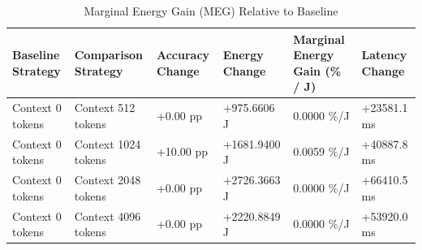 \begin{table}
\caption{Marginal Energy Gain (MEG) Relative to Baseline}
\label{tab:marginal_energy_gain}
\begin{tabular}{llllll}
\toprule
Baseline Strategy & Comparison Strategy & Accuracy Change & Energy Change & Marginal Energy Gain (\% / J) & Latency Change \\
\midrule
Context 0 tokens & Context 512 tokens & +0.00 pp & +975.6606 J & 0.0000 \%/J & +23581.1 ms \\
Context 0 tokens & Context 1024 tokens & +10.00 pp & +1681.9400 J & 0.0059 \%/J & +40887.8 ms \\
Context 0 tokens & Context 2048 tokens & +0.00 pp & +2726.3663 J & 0.0000 \%/J & +66410.5 ms \\
Context 0 tokens & Context 4096 tokens & +0.00 pp & +2220.8849 J & 0.0000 \%/J & +53920.0 ms \\
\bottomrule
\end{tabular}
\end{table}
